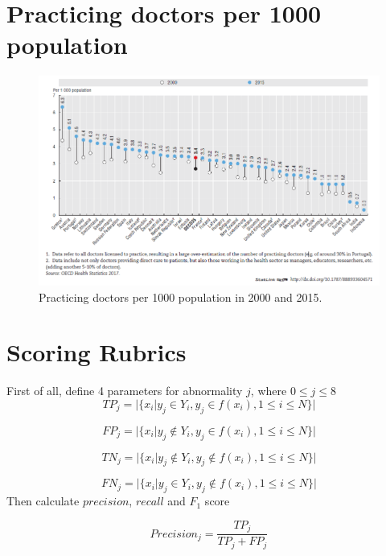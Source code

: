 \documentclass[runningheads]{llncs}
\begin{document}
\appendix

\section{Practicing doctors per 1000 population}

\begin{figure}[H]
	\includegraphics[width=\linewidth]{img/doc_per_1000.png}
	\caption{\label{fig:doc_per_1000} Practicing doctors per 1000 population in 2000 and 2015. \cite{OECD}}
\end{figure}

\section{Scoring Rubrics}
First of all, define 4 parameters for abnormality $j$, where $0 \leq j \leq 8$
\begin{equation}
TP_j = |\{x_i|y_j \in Y_i, y_j \in f(x_i), 1 \leq i \leq N\}|
\end{equation}

\begin{equation}
FP_j = |\{x_i|y_j \notin Y_i, y_j \in f(x_i), 1 \leq i \leq N\}|
\end{equation}

\begin{equation}
TN_j = |\{x_i|y_j \notin Y_i, y_j \notin f(x_i), 1 \leq i \leq N\}|
\end{equation}

\begin{equation}
FN_j = |\{x_i|y_j \in Y_i, y_j \notin f(x_i), 1 \leq i \leq N\}|
\end{equation}
Then calculate $precision$, $recall$ and $F_1$ score

\begin{equation}
Precision_j = \frac{TP_j}{TP_j + FP_j}
\end{equation}
\end{document}
